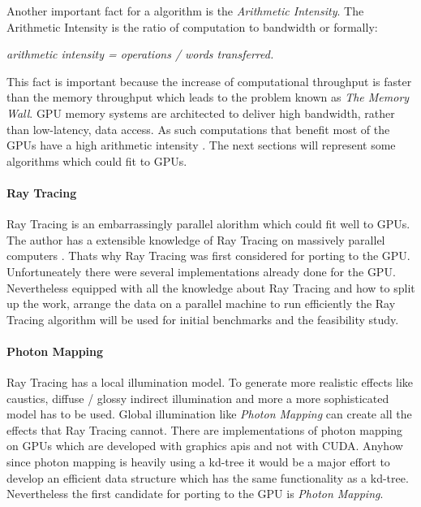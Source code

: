 Another important fact for a algorithm is the \emph{Arithmetic Intensity}. The
Arithmetic Intensity is the ratio of computation to bandwidth or formally:
\begin{center} 
 \emph{arithmetic intensity = operations / words transferred.}
\end{center}
This fact is important because the increase of computational throughput is
faster than the memory throughput which leads to the problem known as \emph{The
Memory Wall}. \gls{GPU} memory systems are architected to deliver high bandwidth,
rather than low-latency, data access. As such computations that benefit most of
the GPUs have a high arithmetic intensity \cite{citeulike:3733428}. The next 
sections will represent some algorithms which could fit to GPUs. 

\paragraph{Ray Tracing} %
\label{par:ray_tracing}
Ray Tracing \cite{citeulike:841961} is an embarrassingly parallel alorithm which
could fit well to GPUs. The author has a extensible knowledge of Ray Tracing on
massively parallel computers \cite{citeulike:80546}. Thats why Ray Tracing was
first considered for porting to the GPU. Unfortuneately there were several
implementations already done for the GPU. Nevertheless equipped with all the
knowledge about Ray Tracing and how to split up the work, arrange the data on a
parallel machine to run efficiently the Ray Tracing algorithm
\cite{citeulike:3770900} will be used for initial benchmarks and the feasibility
study.

\paragraph{Photon Mapping} %
\label{par:photon_mapping}
Ray Tracing has a local illumination model. To generate more realistic effects
like caustics, diffuse / glossy indirect illumination and more a more
sophisticated model has to be used. Global illumination like \emph{Photon
Mapping} \cite{citeulike:635695} can create all the effects that Ray Tracing
cannot. There are implementations of photon mapping on GPUs
\cite{Purcell:2003:PMO} which are developed with graphics apis and not with
CUDA. Anyhow since photon mapping is heavily using a kd-tree it would be a major
effort to develop an efficient data structure which has the same functionality
as a kd-tree. Nevertheless the first candidate for porting to the \gls{GPU} is \emph{Photon Mapping}.

